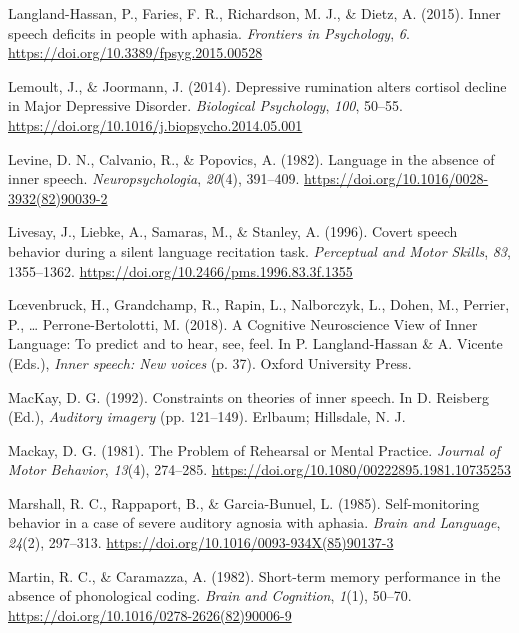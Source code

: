\documentclass[a4paper,12pt,twoside,openright,oldfontcommands]{memoir}
\begin{document}
\hypertarget{ref-langland-hassan_inner_2015}{}
Langland-Hassan, P., Faries, F. R., Richardson, M. J., \& Dietz, A.
(2015). Inner speech deficits in people with aphasia. \emph{Frontiers in
Psychology}, \emph{6}. \url{https://doi.org/10.3389/fpsyg.2015.00528}

\hypertarget{ref-Lemoult2014}{}
Lemoult, J., \& Joormann, J. (2014). Depressive rumination alters
cortisol decline in Major Depressive Disorder. \emph{Biological
Psychology}, \emph{100}, 50--55.
\url{https://doi.org/10.1016/j.biopsycho.2014.05.001}

\hypertarget{ref-levine_language_1982}{}
Levine, D. N., Calvanio, R., \& Popovics, A. (1982). Language in the
absence of inner speech. \emph{Neuropsychologia}, \emph{20}(4),
391--409. \url{https://doi.org/10.1016/0028-3932(82)90039-2}

\hypertarget{ref-livesay_covert_1996}{}
Livesay, J., Liebke, A., Samaras, M., \& Stanley, A. (1996). Covert
speech behavior during a silent language recitation task.
\emph{Perceptual and Motor Skills}, \emph{83}, 1355--1362.
\url{https://doi.org/10.2466/pms.1996.83.3f.1355}

\hypertarget{ref-loevenbruck_cognitive_2018}{}
Lœvenbruck, H., Grandchamp, R., Rapin, L., Nalborczyk, L., Dohen, M.,
Perrier, P., \ldots{} Perrone-Bertolotti, M. (2018). A Cognitive
Neuroscience View of Inner Language: To predict and to hear, see, feel.
In P. Langland-Hassan \& A. Vicente (Eds.), \emph{Inner speech: New
voices} (p. 37). Oxford University Press.

\hypertarget{ref-mackay_constraints_1992}{}
MacKay, D. G. (1992). Constraints on theories of inner speech. In D.
Reisberg (Ed.), \emph{Auditory imagery} (pp. 121--149). Erlbaum;
Hillsdale, N. J.

\hypertarget{ref-mackay_problem_1981}{}
Mackay, D. G. (1981). The Problem of Rehearsal or Mental Practice.
\emph{Journal of Motor Behavior}, \emph{13}(4), 274--285.
\url{https://doi.org/10.1080/00222895.1981.10735253}

\hypertarget{ref-marshall_self-monitoring_1985}{}
Marshall, R. C., Rappaport, B., \& Garcia-Bunuel, L. (1985).
Self-monitoring behavior in a case of severe auditory agnosia with
aphasia. \emph{Brain and Language}, \emph{24}(2), 297--313.
\url{https://doi.org/10.1016/0093-934X(85)90137-3}

\hypertarget{ref-martin_short-term_1982}{}
Martin, R. C., \& Caramazza, A. (1982). Short-term memory performance in
the absence of phonological coding. \emph{Brain and Cognition},
\emph{1}(1), 50--70. \url{https://doi.org/10.1016/0278-2626(82)90006-9}
\end{document}
